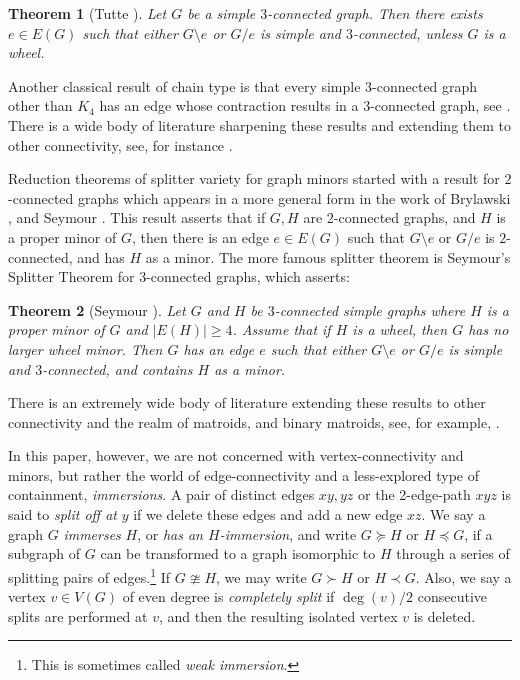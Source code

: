 \documentclass[letterpaper,11pt]{article}
\newtheorem{theorem}{Theorem}[section]
\theoremstyle{definition}
\begin{document}
\begin{theorem}[Tutte \cite{MR0140094}]
Let $G$ be a simple $3$-connected graph. Then there exists $e \in E(G)$ such that either $G\setminus e$ or $G/e$ is simple and $3$-connected, unless $G$ is a wheel.
\end{theorem}


Another classical result of chain type is that every simple 3-connected graph other than $K_4$ has an edge whose contraction results in a $3$-connected graph, see \cite{MR1373655}. %
There is a wide body of literature sharpening these results and extending them to other connectivity, see, for instance \cite{MR2467821, MR1892444}.

Reduction theorems of splitter variety for graph minors started with a result for $2$-connected graphs which appears in a more general form in the work of Brylawski \cite{MR0309764}, and Seymour \cite{MR0439663}. This result asserts that if $G, H$ are $2$-connected graphs, and $H$ is a proper minor of $G$, then there is an edge $e \in E(G)$ such that $G\setminus e$ or $G/e$ is $2$-connected, and has $H$ as a minor. The more famous splitter theorem is Seymour's Splitter Theorem for $3$-connected graphs, which asserts:


\begin{theorem}[Seymour \cite{MR579077}]
Let $G$ and $H$ be $3$-connected simple graphs where $H$ is a proper minor of $G$ and $|E(H)|\ge 4$. Assume that if $H$ is a wheel, then $G$ has no larger wheel minor. Then $G$ has an edge $e$ such that either $G\setminus e$ or $G/e$ is simple and $3$-connected, and contains $H$ as a minor.
\end{theorem}

There is an extremely wide body of literature extending these results to other connectivity and the realm of matroids, and binary matroids, see, for example, \cite{MR2900811,costalonga2018splitter,MR3641803}.

In this paper, however, we are not concerned with vertex-connectivity and minors, but rather the world of edge-connectivity and a less-explored type of containment, \emph{immersions}. A pair of distinct edges $xy, yz$  or the 2-edge-path $xyz$ is said to \emph{split off at} $y$ if we delete these edges and add a new edge $xz$. We say a graph $G$ \emph{immerses} $H$, or \emph{has an $H$-immersion}, and write $G \succeq H$ or $H \preceq G$, if a subgraph of $G$ can be transformed to a graph isomorphic to $H$ through a series of splitting pairs of edges.\footnote{This is sometimes called \emph{weak immersion}.} If $G \ncong H$, we may write $G \succ H$ or $H \prec G$.  Also, we say a vertex $v \in V(G)$ of even degree is \emph{completely split} if $\deg(v)/2$ consecutive splits are performed at $v$, and then the resulting isolated vertex $v$ is deleted.
\end{document}
